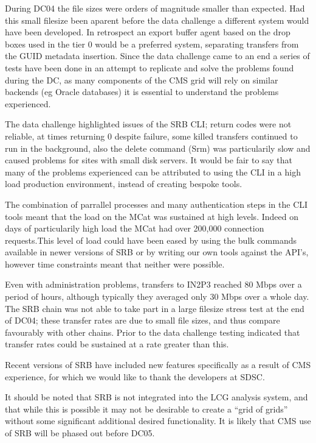 \documentclass{cmspaper}
\begin{document}
During DC04 the file sizes were orders of magnitude smaller than
expected. Had this small filesize been aparent before the data
challenge a different system would have been developed. In retrospect
an export buffer agent based on the drop boxes used in the tier 0
would be a preferred system, separating transfers from the GUID
metadata insertion.  Since the data challenge came to an end a series
of tests have been done in an attempt to replicate and solve the
problems found during the DC, as many components of the CMS grid will
rely on similar backends (eg Oracle databases) it is essential to
understand the problems experienced.

The data challenge highlighted issues of the SRB CLI; return codes were not 
reliable, at times returning 0 despite failure, some killed transfers continued to 
run in the background, also the delete command (Srm) was particularily slow and 
caused problems for sites with small disk servers. It would be fair to say that 
many of the problems experienced can be attributed to using the CLI in
a high load production environment, instead of creating bespoke tools. 

The combination of parrallel processes and
many authentication steps in the CLI tools meant that the load on the MCat was 
sustained at high levels. Indeed on days of particularily high load the MCat
had over 200,000 connection requests.This level of load could have been 
eased by using the bulk commands available in newer versions of SRB or by 
writing our own tools against the API's, however time constraints meant that 
neither were possible.

Even with administration problems, transfers to IN2P3 reached 80 Mbps
over a period of hours, although typically they averaged only 30
Mbps over a whole day. The SRB chain was not able to take part in a
large filesize stress test at the end of DC04; these transfer rates
are due to small file sizes, and thus compare favourably with other
chains. Prior to the data challenge testing indicated that transfer
rates could be sustained at a rate greater than this.

Recent versions of SRB have included new features specifically as a 
result of CMS experience, for which we would like to thank the developers
at SDSC.

It should be noted that SRB is not integrated into the LCG analysis
system, and that while this is possible \cite{gmcat} it may
not be desirable to create a ``grid of grids'' without some
significant additional desired functionality.  It is likely that CMS
use of SRB will be phased out before DC05.
\end{document}

